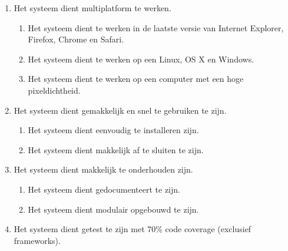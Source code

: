 \begin{enumerate}[{R}1]
\setcounter{enumi}{\value{startvalue}}
	\item Het systeem dient multiplatform te werken.
	\begin{enumerate}
		\item Het systeem dient te werken in de laatste versie van Internet Explorer, Firefox, Chrome en Safari.
		\item Het systeem dient te werken op een Linux, OS X en Windows.
		\item Het systeem dient te werken op een computer met een hoge pixeldichtheid.
	\end{enumerate}
	\item Het systeem dient gemakkelijk en snel te gebruiken te zijn.
	\begin{enumerate}
		\item Het systeem dient eenvoudig te installeren zijn.
		\item Het systeem dient makkelijk af te sluiten te zijn.
	\end{enumerate}
	\item Het systeem dient makkelijk te onderhouden zijn.
	\begin{enumerate}
		\item Het systeem dient gedocumenteert te zijn.
		\item Het systeem dient modulair opgebouwd te zijn.
	\end{enumerate}
	\item Het systeem dient getest te zijn met 70\% code coverage (exclusief frameworks).
\end{enumerate}